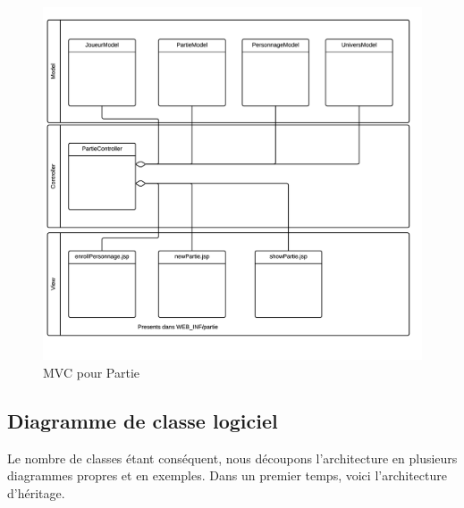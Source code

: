 \documentclass[a4paper,oneside,10pt]{article}
\begin{document}
\begin{figure}[H]
	\begin{center}
		\includegraphics[width=\textwidth]{images/MVC/model1.png}  
		\caption{MVC pour Partie}
	\end{center}
\end{figure}


\subsection{Diagramme de classe logiciel}

Le nombre de classes étant conséquent, nous découpons l'architecture en plusieurs diagrammes propres et en exemples. Dans un premier temps, voici l'architecture d'héritage.  
\end{document}
